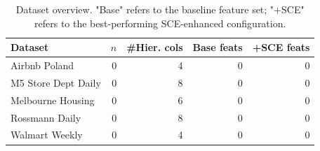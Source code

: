 \begin{table}[htbp]
\centering
\caption{Dataset overview. "Base" refers to the baseline feature set; "+SCE" refers to the best-performing SCE-enhanced configuration.}
\label{tab:datasets}
\begin{tabular}{lrrrr}
\toprule
Dataset & $n$ & \#Hier. cols & Base feats & +SCE feats \\
\midrule
Airbnb Poland & 0 & 4 & 0 & 0 \\
M5 Store Dept Daily & 0 & 8 & 0 & 0 \\
Melbourne Housing & 0 & 6 & 0 & 0 \\
Rossmann Daily & 0 & 8 & 0 & 0 \\
Walmart Weekly & 0 & 4 & 0 & 0 \\
\bottomrule
\end{tabular}
\end{table}